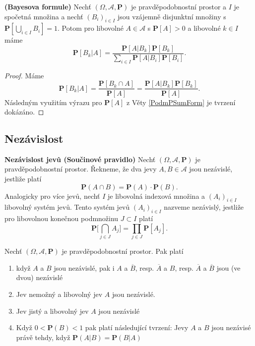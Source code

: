\begin{theorem}\label{PodmPBayes}\textbf{(Bayesova formule)}
 Nechť $( \Omega, \mathcal{A}, \textbf{P})$ je pravděpodobnostní prostor a $I$ je spočetná množina a nechť $(B_{i})_{i \in I}$ jsou vzájemně disjunktní množiny s $\textbf{P}[\bigcup_{i \in I}B_{i}] = 1$. Potom pro libovolné $A \in \mathcal{A}$ s $\textbf{P}[A]>0$ a libovolné $k \in I$ máme
\begin{equation}
\textbf{P}[B_{k}|A] = \frac{\textbf{P}[A|B_{k}]\textbf{P}[B_{k}]}{\sum_{i \in I}\textbf{P}[A|B_{i}]\textbf{P}[B_{i}]}.
\end{equation} 
\end{theorem}
\begin{proof}
Máme
\begin{equation}
\textbf{P}[B_{k}|A] = \frac{\textbf{P}[B_{k} \cap A]}{\textbf{P}[A]} = \frac{\textbf{P}[A|B_{k}]\textbf{P}[B_{k}]}{\textbf{P}[A]}.
\end{equation}
Následným využitím výrazu pro $\textbf{P}[A]$ z Věty \ref{PodmPSumForm} je tvrzení dokázáno.
\end{proof}

\subsection{Nezávislost}
\begin{definition}\label{DefJednoduchaNez}\textbf{Nezávislost jevů (Součinové pravidlo)} Nechť $( \Omega, \mathcal{A}, \textbf{P})$ je pravděpodobnostní prostor. Řekneme, že dva jevy $A,B \in \mathcal{A}$ jsou nezávislé, jestliže platí
\begin{equation}
\textbf{P}(A \cap B) = \textbf{P}(A) \cdot \textbf{P}(B).
\end{equation}
Analogicky pro více jevů, nechť $I$ je libovolná indexová množina a $(A_{i})_{i \in I}$ libovolný systém jevů. Tento systém jevů $(A_{i})_{i \in I}$ nazveme nezávislý, jestliže pro libovolnou konečnou podmnožinu $J \subset I$ platí
\begin{equation}
\textbf{P}\bigg[ \bigcap_{j \in J} A_{j} \bigg] = \prod_{j \in J} \textbf{P}[A_{j}].
\end{equation}
\end{definition}

\begin{theorem}
Nechť $( \Omega, \mathcal{A}, \textbf{P})$ je pravděpodobnostní prostor. Pak platí
\begin{enumerate}
\item když $A$ a $B$ jsou nezávislé, pak i $A$ a $\overline{B}$, resp. $\overline{A}$ a $B$, resp. $\overline{A}$ a $\overline{B}$ jsou (ve dvou) nezávislé
\item Jev nemožný a libovolný jev $A$ jsou nezávislé.
\item Jev jistý a libovolný jev $A$ jsou nezávislé
\item Když $0<\textbf{P}(B)<1$ pak platí následující tvrzení: Jevy $A$ a $B$ jsou nezávisé právě tehdy, když $\textbf{P}(A|B)=\textbf{P}(B|A)$
\end{enumerate}
\end{theorem}

